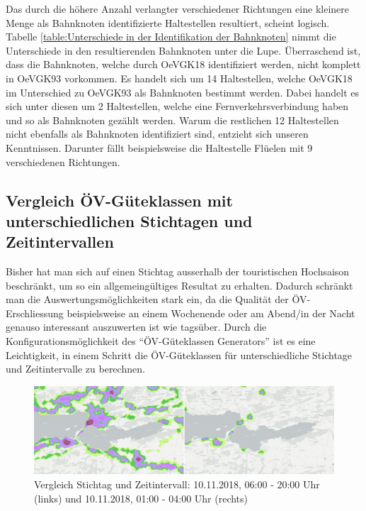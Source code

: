 Das durch die höhere Anzahl verlangter verschiedener Richtungen eine kleinere Menge als Bahnknoten identifizierte Haltestellen resultiert, scheint logisch.
Tabelle \ref{table:Unterschiede in der Identifikation der Bahnknoten} nimmt die Unterschiede in den resultierenden Bahnknoten unter die Lupe.
Überraschend ist, dass die Bahnknoten, welche durch OeVGK18 identifiziert werden, nicht komplett in OeVGK93 vorkommen.
Es handelt sich um 14 Haltestellen, welche OeVGK18 im Unterschied zu OeVGK93 als Bahnknoten bestimmt werden.
Dabei handelt es sich unter diesen um 2 Haltestellen, welche eine Fernverkehrsverbindung haben und so als Bahnknoten gezählt werden.
Warum die restlichen 12 Haltestellen nicht ebenfalls als Bahnknoten identifiziert sind, entzieht sich unseren Kenntnissen.
Darunter fällt beispielsweise die Haltestelle Flüelen mit 9 verschiedenen Richtungen.

\subsection{Vergleich ÖV-Güteklassen mit unterschiedlichen Stichtagen und Zeitintervallen}
\label{Resultate:Vergleich ÖV-Güteklassen mit unterschiedlichen Stichtagen und Zeitintervallen}

Bisher hat man sich auf einen Stichtag ausserhalb der touristischen Hochsaison beschränkt, um so ein allgemeingültiges Resultat zu erhalten.
Dadurch schränkt man die Auswertungsmöglichkeiten stark ein, da die Qualität der \acs{ÖV}-Erschliessung beispielsweise an einem Wochenende oder am Abend/in der Nacht genauso interessant auszuwerten ist wie tagsüber.
Durch die Konfigurationsmöglichkeit des "`\acs{ÖV}-Güteklassen Generators"' ist es eine Leichtigkeit, in einem Schritt die \acs{ÖV}-Güteklassen für unterschiedliche Stichtage und Zeitintervalle zu berechnen.

\begin{figure}[ht]
    \centering
    \includegraphics[width=1.0\linewidth]{technicalreport/img/due_date_comparison.png}
    \caption[Vergleich Stichtag und Zeitintervall]{Vergleich Stichtag und Zeitintervall: 10.11.2018, 06:00 - 20:00 Uhr (links) und 10.11.2018, 01:00 - 04:00 Uhr (rechts)}
    \label{fig:due_date_comparison}
\end{figure}

